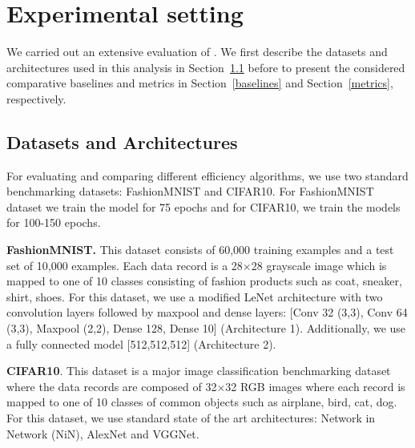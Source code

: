 \section{Experimental setting}
\label{setting}

We carried out an extensive evaluation of \method. %
%
We first describe the datasets and architectures used in this analysis in Section~\ref{datasets} before to present the considered comparative baselines and metrics in Section~\ref{baselines} and Section~\ref{metrics}, respectively. %


\subsection{Datasets and Architectures}
\label{datasets}

For evaluating and comparing different efficiency algorithms, we use two standard benchmarking datasets: FashionMNIST and CIFAR10.
For FashionMNIST dataset we train the model for 75 epochs and for CIFAR10, we train the models for 100-150 epochs.

\noindent\textbf{FashionMNIST.} This dataset consists of 60,000 training examples and a test set of 10,000 examples.
Each data record is a 28$\times$28 grayscale image which is mapped to one of 10 classes consisting of fashion products such as coat, sneaker, shirt, shoes.
For this dataset, we use a modified LeNet architecture with two convolution layers followed by maxpool and dense layers: [Conv 32 (3,3), Conv 64 (3,3), Maxpool (2,2), Dense 128, Dense 10] (Architecture 1). Additionally, we use a fully connected model [512,512,512] (Architecture 2).

\noindent\textbf{CIFAR10}. This dataset is a major image classification benchmarking dataset where the data records are composed of 32$\times$32 RGB images where each record is mapped to one of 10 classes of common objects such as airplane, bird, cat, dog.
For this dataset, we use standard state of the art architectures: Network in Network (NiN), AlexNet and VGGNet.


